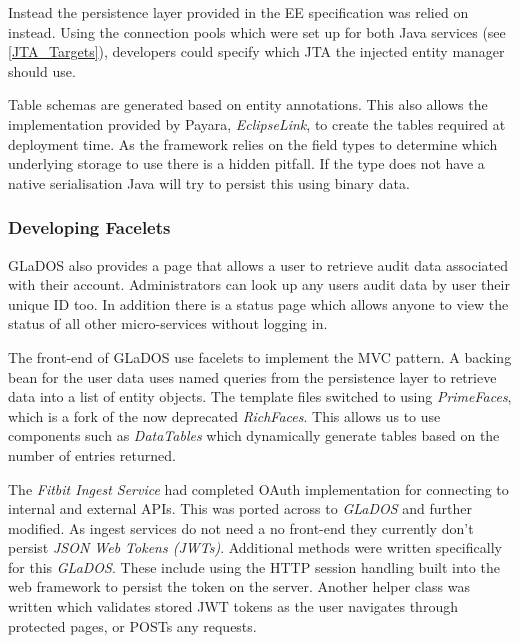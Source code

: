 \par
Instead the persistence layer provided in the EE specification was relied on instead. Using the connection pools which were set up for both Java services (see \ref{JTA_Targets}), developers could specify which JTA the injected entity manager should use.

\par
Table schemas are generated based on entity annotations. This also allows the implementation provided by Payara, \textit{EclipseLink}, to create the tables required at deployment time. As the framework relies on the field types to determine which underlying storage to use there is a hidden pitfall. If the type does not have a native serialisation Java will try to persist this using binary data.

\subsubsection{Developing Facelets}
\par
GLaDOS also provides a page that allows a user to retrieve audit data associated with their account. Administrators can look up any users audit data by user their unique ID too. In addition there is a status page which allows anyone to view the status of all other micro-services without logging in.

\par
The front-end of GLaDOS use facelets to implement the MVC pattern. A backing bean for the user data uses named queries from the persistence layer to retrieve data into a list of entity objects. The template files switched to using \textit{PrimeFaces}\cite{Primefaces}, which is a fork of the now deprecated \textit{RichFaces}. This allows us to use components such as \textit{DataTables} which dynamically generate tables based on the number of entries returned.

\par
The \textit{Fitbit Ingest Service} had completed OAuth implementation for connecting to internal and external APIs. This was ported across to \textit{GLaDOS} and further modified. As ingest services do not need a no front-end they currently don't persist \textit{JSON Web Tokens (JWTs)}. Additional methods were written specifically for this \textit{GLaDOS}. These include using the HTTP session handling built into the web framework to persist the token on the server. Another helper class was written which validates stored JWT tokens as the user navigates through protected pages, or POSTs any requests.

